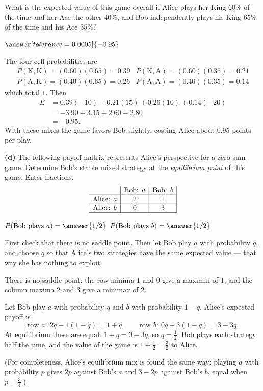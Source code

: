 \documentclass[12pt]{ximera}
\begin{document}
\begin{problem}
\begin{prompt}
What is the expected value of this game overall if Alice plays her King $60\%$ of the
time and her Ace the other $40\%$, and Bob independently plays his King $65\%$ of the
time and his Ace $35\%$?

$\answer[tolerance=0.0005]{-0.95}$

\begin{feedback}
The four cell probabilities are
\[
\begin{array}{ll}
P(\text{K},\text{K})=(0.60)(0.65)=0.39 & P(\text{K},\text{A})=(0.60)(0.35)=0.21\\
P(\text{A},\text{K})=(0.40)(0.65)=0.26 & P(\text{A},\text{A})=(0.40)(0.35)=0.14
\end{array}
\]
which total $1$. \checkmark Then
\begin{align*}
E &= 0.39(-10) + 0.21(15) + 0.26(10) + 0.14(-20)\\
  &= -3.90 + 3.15 + 2.60 - 2.80\\
  &= -0.95.
\end{align*}
With these mixes the game favors Bob slightly, costing Alice about $0.95$ points per
play.
\end{feedback}
\end{prompt}

\begin{prompt}
\textbf{(d)} The following payoff matrix represents Alice's perspective for a zero-sum
game. Determine Bob's stable mixed strategy at the \emph{equilibrium point} of this
game. Enter fractions.
\[
\begin{array}{c|c|c|}
\phantom{|} & \text{Bob: }a & \text{Bob: }b \\\hline
\text{Alice: }a & 2 & 1 \\\hline
\text{Alice: }b & 0 & 3 \\\hline
\end{array}
\]

$P(\text{Bob plays } a)=\answer{1/2}$ \qquad $P(\text{Bob plays } b)=\answer{1/2}$

\begin{hint}
First check that there is no saddle point. Then let Bob play $a$ with probability $q$,
and choose $q$ so that Alice's two strategies have the same expected value --- that way
she has nothing to exploit.
\end{hint}

\begin{feedback}
There is no saddle point: the row minima $1$ and $0$ give a maximin of $1$, and the
column maxima $2$ and $3$ give a minimax of $2$.

Let Bob play $a$ with probability $q$ and $b$ with probability $1-q$. Alice's expected
payoff is
\[
\text{row } a:\ 2q+1(1-q)=1+q, \qquad \text{row } b:\ 0q+3(1-q)=3-3q.
\]
At equilibrium these are equal: $1+q=3-3q$, so $q=\frac12$. Bob plays each strategy
half the time, and the value of the game is $1+\frac12=\frac32$ to Alice.

(For completeness, Alice's equilibrium mix is found the same way: playing $a$ with
probability $p$ gives $2p$ against Bob's $a$ and $3-2p$ against Bob's $b$, equal when
$p=\frac34$.)
\end{feedback}
\end{prompt}
\end{problem}
\end{document}
